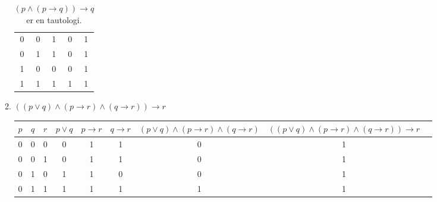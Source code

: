 \documentclass[a4paper, 12pt]{article}  %
\newcommand{\rarr}{\rightarrow}
\begin{document}
\begin{enumerate}
\begin{enumerate}
\begin{table}[h]
\begin{center}
\begin{tabular}{|c|c|c|c|c|}
                                \hline
                                0   & 0   & 1           & 0                     & 1                               \\
                                0   & 1   & 1           & 0                     & 1                               \\
                                1   & 0   & 0           & 0                     & 1                               \\
                                1   & 1   & 1           & 1                     & 1                               \\
                                \hline
                            \end{tabular}
                            \caption*{$(p \land (p \rarr q)) \rarr q$ er en tautologi.}
                        \end{center}
                    \end{table}
              \item $((p \lor q) \land (p \rarr r) \land (q \rarr r)) \rarr r$
                    \begin{table}[h]
                        \begin{center}
                            \begin{tabular}{|c|c|c|c|c|c|c|c|c|}
                                \hline
                                $p$ & $q$ & $r$ & $p \lor q$ & $p \rarr r$ & $q \rarr r$ & $(p \lor q) \land (p \rarr r) \land (q \rarr r)$ & $((p \lor q) \land (p \rarr r) \land (q \rarr r)) \rarr r$ \\
                                \hline
                                0   & 0   & 0   & 0          & 1           & 1           & 0                                                & 1                                                          \\
                                0   & 0   & 1   & 0          & 1           & 1           & 0                                                & 1                                                          \\
                                0   & 1   & 0   & 1          & 1           & 0           & 0                                                & 1                                                          \\
                                0   & 1   & 1   & 1          & 1           & 1           & 1                                                & 1                                                          \\

\end{tabular}
\end{center}
\end{table}
\end{enumerate}
\end{enumerate}
\end{document}

